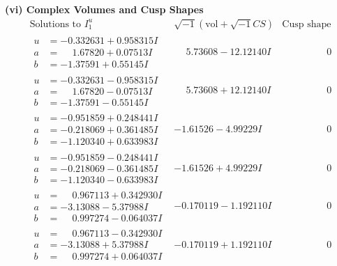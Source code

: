 \documentclass[1p]{elsarticle_modified}
\theoremstyle{definition}
\newcommand{\I}{\sqrt{-1}}
\begin{document}
\newpage\flushleft \textbf{(vi) Complex Volumes and Cusp Shapes}
$$\begin{array}{c|c|c}  
\text{Solutions to }I^u_{1}& \I (\text{vol} + \sqrt{-1}CS) & \text{Cusp shape}\\
 \hline 
\begin{aligned}
u &= -0.332631 + 0.958315 I \\
a &= \phantom{-}1.67820 + 0.07513 I \\
b &= -1.37591 + 0.55145 I\end{aligned}
 & \phantom{-}5.73608 - 12.12140 I & \phantom{-0.000000 } 0 \\ \hline\begin{aligned}
u &= -0.332631 - 0.958315 I \\
a &= \phantom{-}1.67820 - 0.07513 I \\
b &= -1.37591 - 0.55145 I\end{aligned}
 & \phantom{-}5.73608 + 12.12140 I & \phantom{-0.000000 } 0 \\ \hline\begin{aligned}
u &= -0.951859 + 0.248441 I \\
a &= -0.218069 + 0.361485 I \\
b &= -1.120340 + 0.633983 I\end{aligned}
 & -1.61526 - 4.99229 I & \phantom{-0.000000 } 0 \\ \hline\begin{aligned}
u &= -0.951859 - 0.248441 I \\
a &= -0.218069 - 0.361485 I \\
b &= -1.120340 - 0.633983 I\end{aligned}
 & -1.61526 + 4.99229 I & \phantom{-0.000000 } 0 \\ \hline\begin{aligned}
u &= \phantom{-}0.967113 + 0.342930 I \\
a &= -3.13088 - 5.37988 I \\
b &= \phantom{-}0.997274 - 0.064037 I\end{aligned}
 & -0.170119 - 1.192110 I & \phantom{-0.000000 } 0 \\ \hline\begin{aligned}
u &= \phantom{-}0.967113 - 0.342930 I \\
a &= -3.13088 + 5.37988 I \\
b &= \phantom{-}0.997274 + 0.064037 I\end{aligned}
 & -0.170119 + 1.192110 I & \phantom{-0.000000 } 0 \\ \hline\begin{aligned}

\end{aligned}
\end{array}$$
\end{document}
